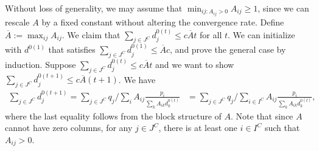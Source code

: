 Without loss of generality, we may assume that $\min_{ij:A_{ij}>0}A_{ij}\geq1$,
since we can rescale $A$ by a fixed constant without altering the
convergence rate. Define $\overline{A}:=\max_{ij}A_{ij}$. We claim
that $\sum_{j\in J^{C}}d_{j}^{0(t)}\leq c\overline{A}t$ for all $t$.
We can initialize with $d^{0(1)}$ that satisfies $\sum_{j\in J^{C}}d_{j}^{0(1)}\leq\overline{A}c$,
and prove the general case by induction. Suppose $\sum_{j\in J^{C}}d_{j}^{0(t)}\leq c\overline{A}t$
and we want to show $\sum_{j\in J^{C}}d_{j}^{0(t+1)}\leq c\overline{A}(t+1)$.
We have 
\begin{align*}
\sum_{j\in J^{C}}d_{j}^{0(t+1)}=\sum_{j\in J^{C}}q_{j}/\sum_{i}A_{ij}\frac{p_{i}}{\sum_{k}A_{ik}d_{k}^{0(t)}} & =\sum_{j\in J^{C}}q_{j}/\sum_{i\in I^{C}}A_{ij}\frac{p_{i}}{\sum_{k}A_{ik}d_{k}^{0(t)}},
\end{align*}
 where the last equality follows from the block structure of $A$.
Note that since $A$ cannot have zero columns, for any $j\in J^{C}$,
there is at least one $i\in I^{C}$ such that $A_{ij}>0$. 

